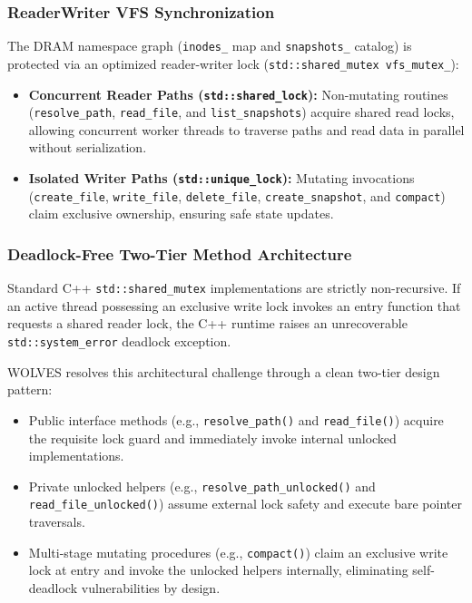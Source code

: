 \documentclass[conference]{IEEEtran}
\begin{document}
\subsubsection{ReaderWriter VFS Synchronization}
The DRAM namespace graph (\texttt{inodes\_} map and \texttt{snapshots\_} catalog) is protected via an optimized reader-writer lock (\texttt{std::shared\_mutex vfs\_mutex\_}):
\begin{itemize}
    \item \textbf{Concurrent Reader Paths (\texttt{std::shared\_lock}):} Non-mutating routines (\texttt{resolve\_path}, \texttt{read\_file}, and \texttt{list\_snapshots}) acquire shared read locks, allowing concurrent worker threads to traverse paths and read data in parallel without serialization.
    \item \textbf{Isolated Writer Paths (\texttt{std::unique\_lock}):} Mutating invocations (\texttt{create\_file}, \texttt{write\_file}, \texttt{delete\_file}, \texttt{create\_snapshot}, and \texttt{compact}) claim exclusive ownership, ensuring safe state updates.
\end{itemize}

\subsubsection{Deadlock-Free Two-Tier Method Architecture}
Standard C++ \texttt{std::shared\_mutex} implementations are strictly non-recursive. If an active thread possessing an exclusive write lock invokes an entry function that requests a shared reader lock, the C++ runtime raises an unrecoverable \texttt{std::system\_error} deadlock exception.

WOLVES resolves this architectural challenge through a clean two-tier design pattern:
\begin{itemize}
    \item Public interface methods (e.g., \texttt{resolve\_path()} and \texttt{read\_file()}) acquire the requisite lock guard and immediately invoke internal unlocked implementations.
    \item Private unlocked helpers (e.g., \texttt{resolve\_path\_unlocked()} and \texttt{read\_file\_unlocked()}) assume external lock safety and execute bare pointer traversals.
    \item Multi-stage mutating procedures (e.g., \texttt{compact()}) claim an exclusive write lock at entry and invoke the unlocked helpers internally, eliminating self-deadlock vulnerabilities by design.
\end{itemize}
\end{document}
